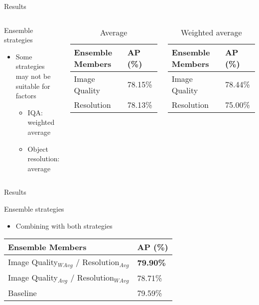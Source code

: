 \begin{frame}{Results}{}
\begin{columns}
    \begin{block}{Ensemble strategies}
    \begin{itemize}
        \item Some strategies may not be suitable for factors
        \begin{itemize}
            \item IQA: weighted average
            \item Object resolution: average
        \end{itemize}    
    \end{itemize}  
    

\end{block} 
    \begin{table}[h]
    \centering
    \caption{Average}
    \begin{tabular}{|l|l|}
    \hline
    \textbf{Ensemble Members}        & \textbf{AP (\%)} \\ \hline
    Image Quality & 78.15\% \\ \hline
    Resolution    & 78.13\% \\ \hline
    \end{tabular}
    \end{table}

    \begin{table}[h]
    \centering
    \caption{Weighted average}
    \begin{tabular}{|l|l|}
    \hline
    \textbf{Ensemble Members}        & \textbf{AP (\%)} \\ \hline
    Image Quality & 78.44\% \\ \hline
    Resolution    & 75.00\% \\ \hline
    \end{tabular}
    \end{table}
\end{columns}
\end{frame}


\begin{frame}{Results}{}
    \begin{block}{Ensemble strategies}
    \begin{itemize}
        \item Combining with both strategies  
    \end{itemize}  
\end{block} 
    \begin{table}[h]
    \centering
    \begin{tabular}{|l|l|}
    \hline
    \textbf{Ensemble Members}                  & \textbf{AP (\%)} \\ \hline
    Image Quality$_{WAvg}$ / Resolution$_{Avg}$ & \textbf{79.90\%} \\ \hline
    Image Quality$_{Avg}$ / Resolution$_{WAvg}$ & 78.71\% \\ \hline
    Baseline                          & 79.59\% \\ \hline
    \end{tabular}
    \end{table}
\end{frame}

